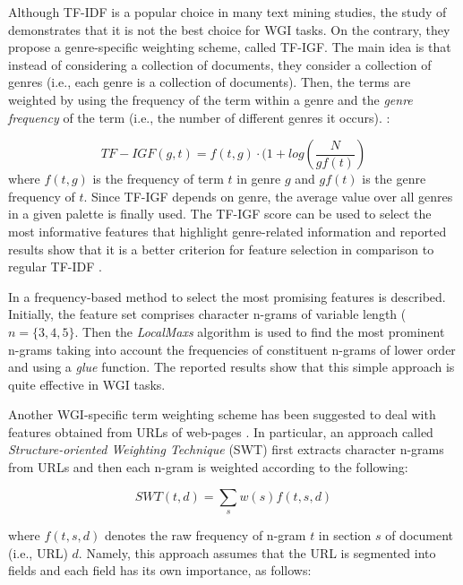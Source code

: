 Although TF-IDF is a popular choice in many text mining studies, the study of \parencite{sugiyanto2014term} demonstrates that it is not the best choice for WGI tasks. On the contrary, they propose a genre-specific weighting scheme, called TF-IGF. The main idea is that instead of considering a collection of documents, they consider a collection of genres (i.e., each genre is a collection of documents). Then, the terms are weighted by using the frequency of the term within a genre and the \textit{genre frequency} of the term (i.e., the number of different genres it occurs). :

 \begin{equation}\label{chap:relevant_work:eq:tf_igf}
 	TF-IGF(g,t) = f(t,g) \cdot (1 + log \left( \frac{N}{gf(t)} \right)
 \end{equation}
\noindent
where $f(t,g)$ is the frequency of term $t$ in genre $g$ and $gf(t)$ is the genre frequency of $t$. Since TF-IGF depends on genre, the average value over all genres in a given palette is finally used. The TF-IGF score can be used to select the most informative features that highlight genre-related information and reported results show that it is a better criterion for feature selection in comparison to regular TF-IDF \parencite{sugiyanto2014term}.

In \parencite{kanaris2009learning} a frequency-based method to select the most promising features is described. Initially, the feature set comprises character n-grams of variable length ($n = \{3, 4, 5\}$. Then the \textit{LocalMaxs} algorithm is used to find the most prominent n-grams taking into account the frequencies of constituent n-grams of lower order and using a \textit{glue} function. The reported results show that this simple approach is quite effective in WGI tasks.

Another WGI-specific term weighting scheme has been suggested to deal with features obtained from URLs of web-pages . In particular, an approach called \textit{Structure-oriented Weighting Technique} (SWT) first extracts character n-grams from URLs and then each n-gram is weighted according to the following: 

\begin{equation}\label{eq:jebary_url_weigh_cngrams_1}
	SWT(t, d) = \sum_{s} w(s) f(t, s, d)
\end{equation}

\noindent
where $f(t,s,d)$ denotes the raw frequency of n-gram $t$ in section $s$ of document (i.e., URL) $d$. Namely, this approach assumes that the URL is segmented into fields and each field has its own importance, as follows:

